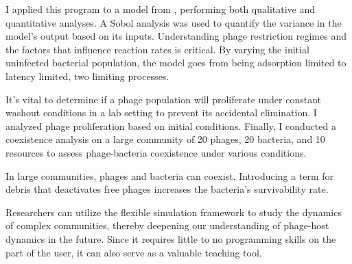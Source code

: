 \documentclass[11pt, oneside, final]{Thesis}
\begin{document}
{    I applied this program to a model from \citet{gengUsingBacterialPopulation2024}, performing both qualitative and quantitative analyses. 
    A Sobol analysis was used to quantify the variance in the model’s output based on its inputs. 
    Understanding phage restriction regimes and the factors that influence reaction rates is critical. 
    By varying the initial uninfected bacterial population, the model goes from being adsorption limited to latency limited, two limiting processes. 

    It’s vital to determine if a phage population will proliferate under constant washout conditions in a lab setting to prevent its accidental elimination. 
    I analyzed phage proliferation based on initial conditions. 
    Finally, I conducted a coexistence analysis on a large community of 20 phages, 20 bacteria, and 10 resources to assess phage-bacteria coexistence under various conditions. 

    In large communities, phages and bacteria can coexist. 
    Introducing a term for debris that deactivates free phages increases the bacteria’s survivability rate.

    Researchers can utilize the flexible simulation framework to study the dynamics of complex communities, thereby deepening our understanding of phage-host dynamics in the future. 
    Since it requires little to no programming skills on the part of the user, it can also serve as a valuable teaching tool. 
}
\clearpage 

\end{document}
